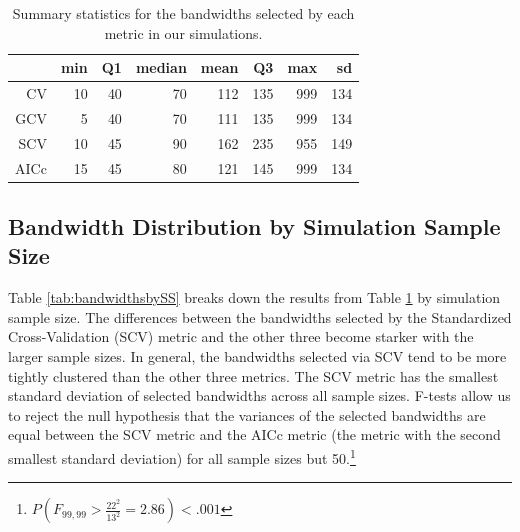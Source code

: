 \documentclass{article}\usepackage{graphicx, color}
\begin{document}
\begin{table}[ht]
\begin{center}
\begin{tabular}{rrrrrrrr}
  \hline
 & min & Q1 & median & mean & Q3 & max & sd \\ 
  \hline
CV & 10 & 40 & 70 & 112 & 135 & 999 & 134 \\ 
  GCV & 5 & 40 & 70 & 111 & 135 & 999 & 134 \\ 
  SCV & 10 & 45 & 90 & 162 & 235 & 955 & 149 \\ 
  AICc & 15 & 45 & 80 & 121 & 145 & 999 & 134 \\ 
   \hline
\end{tabular}
\caption{Summary statistics for the bandwidths selected by each metric in our simulations.}
\label{tab:bandwidthsumstats}
\end{center}
\end{table}




\subsection{Bandwidth Distribution by Simulation Sample Size}

Table \ref{tab:bandwidthsbySS} breaks down the results from Table \ref{tab:bandwidthsumstats} by simulation sample size. The differences between the bandwidths selected by the Standardized Cross-Validation (SCV) metric and the other three become starker with the larger sample sizes. In general, the bandwidths selected via SCV tend to be more tightly clustered than the other three metrics. The SCV metric has the smallest standard deviation of selected bandwidths across all sample sizes. F-tests allow us to reject the null hypothesis that the variances of the selected bandwidths are equal between the SCV metric and the AICc metric (the metric with the second smallest standard deviation) for all sample sizes but 50.\footnote{$P(F_{99, 99}>\frac{22^2}{13^2}=2.86) < .001$} 
\end{document}
